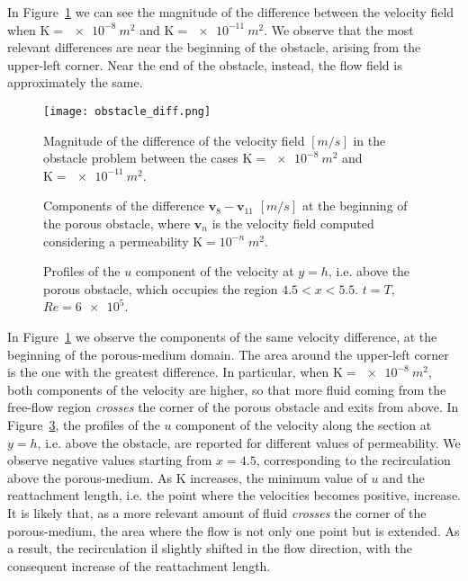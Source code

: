 In Figure~\ref{fig:obstacle_diff} we can see the magnitude of the difference between the velocity field when $\mathrm{K}=\SI{e-8}{m^2}$ and $\mathrm{K}=\SI{e-11}{m^2}$. We observe that the most relevant differences are near the beginning of the obstacle, arising from the upper-left corner. Near the end of the obstacle, instead, the flow field is approximately the same.
\begin{figure}
	\centering
	\texttt{[image: obstacle\_diff.png]}
	\caption[Magnitude of the difference of the velocity field in the obstacle problem considering two values of permeability]{Magnitude of the difference of the velocity field $[\si{m/s}]$ in the obstacle problem between the cases $\mathrm{K}=\SI{e-8}{m^2}$ and $\mathrm{K}=\SI{e-11}{m^2}$.}
	\label{fig:obstacle_diff}
\end{figure}
\begin{figure}
	\centering
	\hspace{2cm}
	\caption[Difference of the velocity field at the beginning of the porous obstacle between two values of permeability]{Components of the difference $\mathbf{v}_8 - \mathbf{v}_{11}$ $[\si{m/s}]$ at the beginning of the porous obstacle, where $\mathbf{v}_n$ is the velocity field computed considering a permeability $\mathrm{K}=10^{-n}\;\si{m^2}$.}
	\label{fig:obstacle_pm_diff}
\end{figure}
\begin{figure}
	\centering
	
	\caption[Profiles of the $u$ component of the velocity above the porous obstacle]{Profiles of the $u$ component of the velocity at $y=h$, i.e. above the porous obstacle, which occupies the region $4.5 < x < 5.5$. $t=T$, $Re=\num{6e5}$.}
	\label{fig:obstacle_velx}
\end{figure}
In Figure~\ref{fig:obstacle_diff} we observe the components of the same velocity difference, at the beginning of the porous-medium domain. The area around the upper-left corner is the one with the greatest difference. In particular, when $\mathrm{K} = \SI{e-8}{m^2}$, both components of the velocity are higher, so that more fluid coming from the free-flow region \emph{crosses} the corner of the porous obstacle and exits from above.
In Figure~\ref{fig:obstacle_velx}, the profiles of the $u$ component of the velocity along the section at $y=h$, i.e. above the obstacle, are reported for different values of permeability. We observe negative values starting from $x=4.5$, corresponding to the recirculation above the porous-medium. As $\mathrm{K}$ increases, the minimum value of $u$ and the reattachment length, i.e. the point where the velocities becomes positive, increase. It is likely that, as a more relevant amount of fluid \emph{crosses} the corner of the porous-medium, the area where the flow is not only one point but is extended. As a result, the recirculation il slightly shifted in the flow direction, with the consequent increase of the reattachment length.
